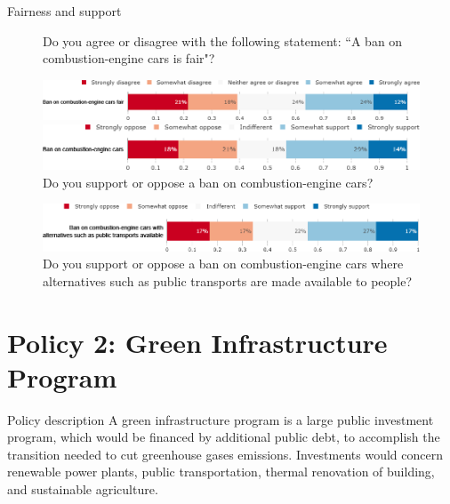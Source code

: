 \documentclass[aspectratio=169,9pt,dvipsnames]{beamer}
\begin{document}
\begin{frame}{Fairness and support}%
\begin{figure}[h!]
\centering
\caption{Do you agree or disagree with the following statement: ``A ban on combustion-engine cars is fair"?}
\includegraphics[width=\textwidth]{../figures/DK/standard_fair_DK.png}
\vspace{.5cm}
\centering
\caption{Do you support or oppose a ban on combustion-engine cars?}
\includegraphics[width=\textwidth]{../figures/DK/standard_support_DK.png}
\end{figure}

\end{frame}

\begin{frame}{}%
\begin{figure}[h!]
\centering
\caption{Do you support or oppose a ban on combustion-engine cars where alternatives such as public transports are made available to people?}
\includegraphics[width=\textwidth]{../figures/DK/standard_public_transport_support_DK.png}
\end{figure}
\end{frame}

\section{Policy 2: Green Infrastructure Program}

\begin{frame}{Policy description}%
A green infrastructure program is a large public investment program, which would be financed by additional public debt, to accomplish the transition needed to cut greenhouse gases emissions. Investments would concern renewable power plants, public transportation, thermal renovation of building, and sustainable agriculture.
\end{frame}
\end{document}
